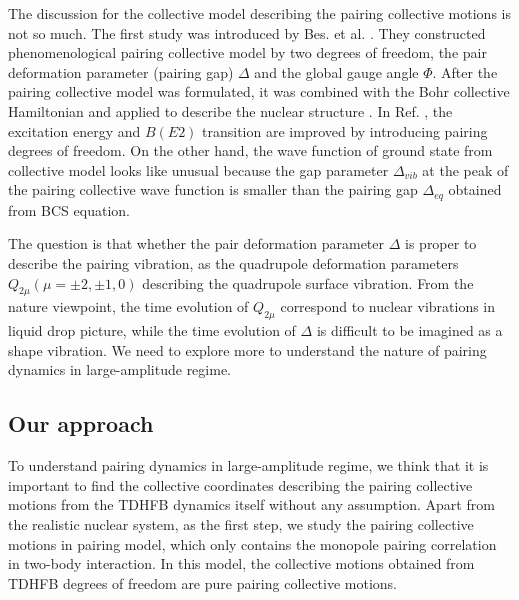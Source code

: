 \documentclass[11pt]{book} %
\begin{document}
The discussion for the collective model describing the pairing collective motions is not so much. The first study was introduced by Bes. et al. \cite{BBPK70}. They constructed phenomenological pairing collective model by two degrees of freedom, the pair deformation parameter (pairing gap) $\Delta$ and the global gauge angle $\Phi$. After the pairing collective model was formulated, it was combined with the Bohr collective Hamiltonian and applied to describe the nuclear structure \cite{GPBW85, ZPPRS99, P07}. 
In Ref. \cite{ZPPRS99}, the excitation energy and $B(E2)$ transition are improved by introducing pairing degrees of freedom. On the other hand, the wave function of ground state from collective model looks like unusual because the gap parameter $\Delta_{vib}$ at the peak of the pairing collective wave function is smaller than the pairing gap $\Delta_{eq}$ obtained from BCS equation. 

The question is that whether the pair deformation parameter $\Delta$ is proper to describe the pairing vibration, as the quadrupole deformation parameters $Q_{2\mu} (\mu=\pm2,\pm1,0)$ describing the quadrupole surface vibration. From the nature viewpoint, the time evolution of $Q_{2\mu}$ correspond to nuclear vibrations in liquid drop picture, while the time evolution of $\Delta$ is difficult to be imagined as a shape vibration. We need to explore more to understand the nature of pairing dynamics in large-amplitude regime. 

\subsection{Our approach}

To understand pairing dynamics in large-amplitude regime, we think that it is important to find the collective coordinates describing the pairing collective motions from the TDHFB dynamics itself without any assumption. Apart from the realistic nuclear system, as the first step, we study the pairing collective motions in pairing model, which only contains the monopole pairing correlation in two-body interaction. In this model, the collective motions obtained from TDHFB degrees of freedom are pure pairing collective motions.
\end{document}
